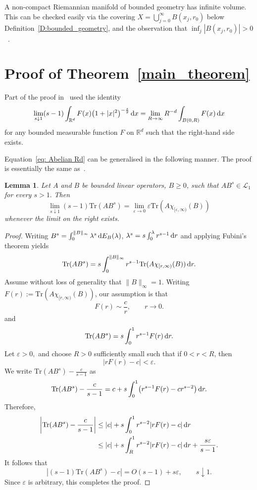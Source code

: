 \documentclass[pdftex]{sigma}
\numberwithin{equation}{section}
\newtheorem{Lemma}[Theorem]{Lemma}
\begin{document}
\begin{Remark}\label{R: metric balls lower bound}
A non-compact Riemannian manifold of bounded geometry has infinite volume. This can be checked easily via the covering $X = \bigcup_{j=0}^\infty B(x_j,r_0)$ below Definition~\ref{D:bounded_geometry}, and the observation that $\inf_{j} |B(x_j, r_0)| > 0$~\cite{Kodani1988}.
\end{Remark}

\section{Proof of Theorem~\ref{main_theorem}}
Part of the proof in~\cite{AMSZ} used the identity
\begin{equation}\label{eq: Abelian Rd}
 \lim_{s \downarrow 1} (s-1)\int_{\mathbb{R}^d} F(x)\big(1+|x|^2\big)^{-\frac{s}{2}}\,{\rm d}x = \lim_{R\to\infty} R^{-d}\int_{B(0,R)}F(x)\,{\rm d}x
\end{equation}
for any bounded measurable function $F$ on $\mathbb{R}^d$ such that the right-hand side exists.

Equation~\eqref{eq: Abelian Rd} can be generalised in the following manner. The proof is essentially the same as~\cite[Lemma 6.1]{AMSZ}.


\begin{Lemma}\label{L: trace formula}
 Let $A$ and $B$ be bounded linear operators, $B\geq 0$, such that $AB^s \in \mathcal{L}_1$ for every $s>1.$ Then
 \[
 \lim_{s\downarrow 1}(s-1)\mathrm{Tr}(AB^s) = \lim_{\varepsilon\to 0} \varepsilon \mathrm{Tr}(A\chi_{[\varepsilon,\infty)}(B))
 \]
 whenever the limit on the right exists.
\end{Lemma}
\begin{proof}
 Writing $B^s = \int_0^{\|B\|_{\infty}} \lambda^s\,{\rm d}E_B(\lambda)$, $\lambda^s = s\int_0^\lambda r^{s-1}\,{\rm d}r$
 and applying Fubini's theorem yields
 \[
 \mathrm{Tr}(AB^s) = s\int_0^{\|B\|_{\infty}} r^{s-1} \mathrm{Tr}(A\chi_{[r,\infty)}(B))\,{\rm d}r.
 \]
 Assume without loss of generality that $\|B\|_{\infty} = 1.$
 Writing $F(r) := \mathrm{Tr}(A\chi_{[r,\infty)}(B))$, our assumption is that
 \[
 F(r) \sim \frac{c}{r},\qquad r\to 0.
 \]
 and
 \[
 \mathrm{Tr}(AB^s) = s\int_0^1 r^{s-1}F(r)\,{\rm d}r.
 \]
 Let $\varepsilon>0,$ and choose $R>0$ sufficiently small such that if $0<r<R$, then
 \[
 |rF(r)-c|<\varepsilon.
 \]
 We write $\mathrm{Tr}(AB^s)-\frac{c}{s-1}$ as
 \[
 \mathrm{Tr}(AB^s)-\frac{c}{s-1} = c+s\int_0^1 \bigl(r^{s-1}F(r) - c r^{s-2}\bigr)\,{\rm d}r.
 \]
 Therefore,
 \begin{align*}
 \bigg|\mathrm{Tr}(AB^s)-\frac{c}{s-1}\bigg| & \leq |c|+s\int_0^1 r^{s-2}|rF(r)-c|\,{\rm d}r\\
 & \leq |c|+s\int_R^1 r^{s-2}|rF(r)-c|\,{\rm d}r + \frac{s\varepsilon}{s-1}.
 \end{align*}
 It follows that
 \[
 |(s-1)\mathrm{Tr}(AB^s)-c| = O(s-1)+s\varepsilon,\qquad s\downarrow 1.
 \]
 Since $\varepsilon$ is arbitrary, this completes the proof.
\end{proof}
\end{document}
